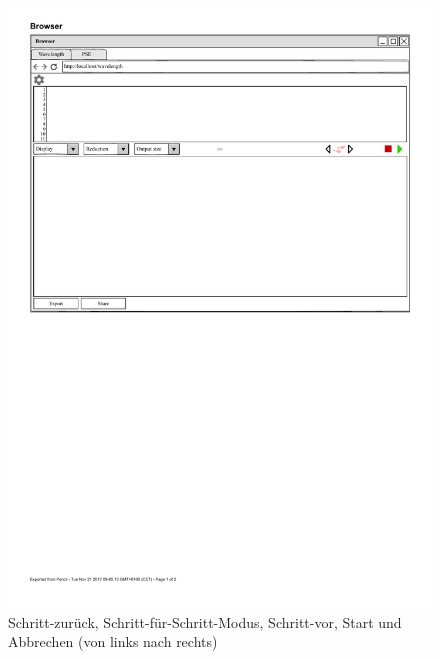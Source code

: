 \documentclass[parskip=full,11pt,twoside]{scrartcl}
\begin{document}
\begin{figure}[H]
	\centering
	\includegraphics{img/actionButton}
	\caption{\label{fig:actionButtons} Schritt-zurück, Schritt-für-Schritt-Modus, 
	Schritt-vor, Start und Abbrechen (von links nach rechts)}
\end{figure}
\end{document}
